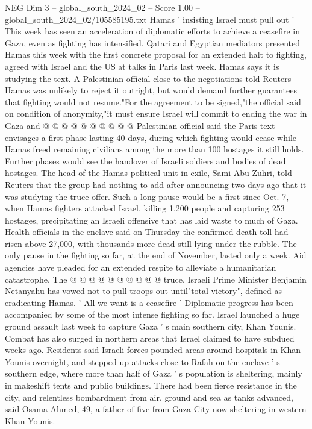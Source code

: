 \begin{textsample}{NEG Dim 3 – global\_south\_2024\_02 – Score 1.00 – global\_south\_2024\_02/105585195.txt}
Hamas ' insisting Israel must pull out ' This week has seen an acceleration of diplomatic efforts to achieve a ceasefire in Gaza, even as fighting has intensified.
Qatari and Egyptian mediators presented Hamas this week with the first concrete proposal for an extended halt to fighting, agreed with Israel and the US at talks in Paris last week.
Hamas says it is studying the text.
A Palestinian official close to the negotiations told Reuters Hamas was unlikely to reject it outright, but would demand further guarantees that fighting would not resume."For the agreement to be signed,"the official said on condition of anonymity,"it must ensure Israel will commit to ending the war in Gaza and @ @ @ @ @ @ @ @ @ @ Palestinian official said the Paris text envisages a first phase lasting 40 days, during which fighting would cease while Hamas freed remaining civilians among the more than 100 hostages it still holds.
Further phases would see the handover of Israeli soldiers and bodies of dead hostages.
The head of the Hamas political unit in exile, Sami Abu Zuhri, told Reuters that the group had nothing to add after announcing two days ago that it was studying the truce offer.
Such a long pause would be a first since Oct. 7, when Hamas fighters attacked Israel, killing 1,200 people and capturing 253 hostages, precipitating an Israeli offensive that has laid waste to much of Gaza.
Health officials in the enclave said on Thursday the confirmed death toll had risen above 27,000, with thousands more dead still lying under the rubble.
The only pause in the fighting so far, at the end of November, lasted only a week.
Aid agencies have pleaded for an extended respite to alleviate a humanitarian catastrophe.
The @ @ @ @ @ @ @ @ @ @ truce.
Israeli Prime Minister Benjamin Netanyahu has vowed not to pull troops out until"total victory", defined as eradicating Hamas. ' All we want is a ceasefire ' Diplomatic progress has been accompanied by some of the most intense fighting so far.
Israel launched a huge ground assault last week to capture Gaza ' s main southern city, Khan Younis.
Combat has also surged in northern areas that Israel claimed to have subdued weeks ago.
Residents said Israeli forces pounded areas around hospitals in Khan Younis overnight, and stepped up attacks close to Rafah on the enclave ' s southern edge, where more than half of Gaza ' s population is sheltering, mainly in makeshift tents and public buildings.
There had been fierce resistance in the city, and relentless bombardment from air, ground and sea as tanks advanced, said Osama Ahmed, 49, a father of five from Gaza City now sheltering in western Khan Younis.

\end{textsample}
